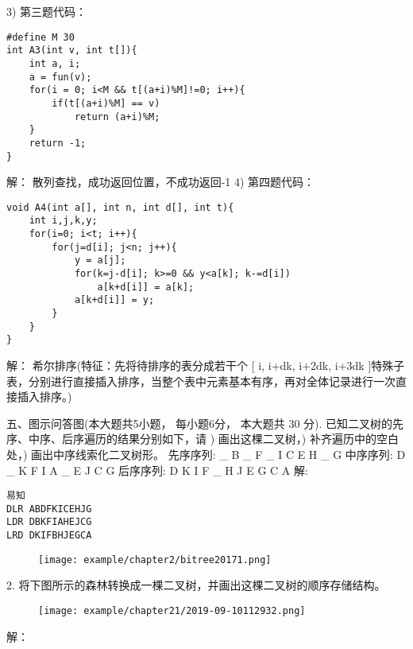 3) 第三题代码：\newline
\begin{lstlisting}[basicstyle=\small\ttfamily, caption={}, numbers=none]
#define M 30
int A3(int v, int t[]){
	int a, i;
	a = fun(v);
	for(i = 0; i<M && t[(a+i)%M]!=0; i++){
		if(t[(a+i)%M] == v)
			return (a+i)%M;
	}
	return -1;
}
\end{lstlisting}
解：\newline
散列查找，成功返回位置，不成功返回-1
4) 第四题代码：\newline
\begin{lstlisting}[basicstyle=\small\ttfamily, caption={}, numbers=none]
void A4(int a[], int n, int d[], int t){
	int i,j,k,y;
	for(i=0; i<t; i++){
		for(j=d[i]; j<n; j++){
			y = a[j];
			for(k=j-d[i]; k>=0 && y<a[k]; k-=d[i])
				a[k+d[i]] = a[k];
			a[k+d[i]] = y;
		}
	}
}
\end{lstlisting}
解：\newline
希尔排序(特征：先将待排序的表分成若干个 [ i, i+dk, i+2dk, i+3dk  ]特殊子表，分别进行直接插入排序，当整个表中元素基本有序，再对全体记录进行一次直接插入排序。)\newline

五、图示问答图(本大题共5小题， 每小题6分， 本大题共 30 分). 已知二叉树的先序、中序、后序遍历的结果分别如下，请 ) 画出这棵二叉树，) 补齐遍历中的空白处，) 画出中序线索化二叉树形。\newline
先序序列: \_ B \_ F \_ I C E H \_ G \newline
中序序列: D \_ K F I A \_ E J C G \newline
后序序列: D K I F \_ H J E G C A \newline
解:\newline
\begin{lstlisting}[basicstyle=\small\ttfamily, caption={}, numbers=none]
易知
DLR ABDFKICEHJG
LDR DBKFIAHEJCG
LRD DKIFBHJEGCA
\end{lstlisting}

\begin{figure}[H]
	\centering  %
	\texttt{[image: example/chapter2/bitree20171.png]}
\end{figure}
2. 将下图所示的森林转换成一棵二叉树，并画出这棵二叉树的顺序存储结构。\newline
\begin{figure}[H]
	\centering  %
	\texttt{[image: example/chapter21/2019-09-10112932.png]}
\end{figure} 
解：\newline


